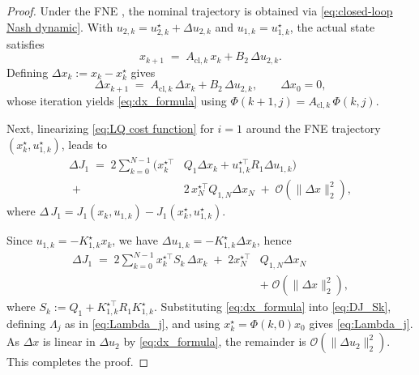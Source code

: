 \documentclass[letterpaper, 10 pt, conference]{ieeeconf}  %
\newtheorem{theorem}{\textbf{Theorem}} %
\begin{document}
\begin{proof}
Under the FNE
, the nominal trajectory is obtained via \eqref{eq:closed-loop Nash dynamic}. With $u_{2,k}=u_{2,k}^\star+\Delta u_{2,k}$ and $u_{1,k}=u_{1,k}^\star$, the actual state satisfies
\begin{equation*}
x_{k+1} \;=\; A_{\text{cl},k} \, x_k + B_2 \, \Delta u_{2,k}.
\end{equation*}
Defining $\Delta x_k := x_k - x_k^\star$ gives
\begin{equation*}\label{eq:dx_recursion}
\Delta x_{k+1} \;=\; A_{\text{cl},k} \, \Delta x_k + B_2 \, \Delta u_{2,k}, \qquad \Delta x_0 = 0,
\end{equation*}
whose iteration yields \eqref{eq:dx_formula} using $\Phi(k+1,j)=A_{\text{cl},k}\,\Phi(k,j)$.

Next, linearizing \eqref{eq:LQ cost function} for $i=1$ around the FNE trajectory $(x_k^\star,u_{1,k}^\star)$, leads to
\begin{equation*}\label{eq:DJ_raw}
\begin{aligned}
    \Delta J_1 \;=\; 2 \sum_{k=0}^{N-1} \big( x_k^{\star\top}& Q_1 \Delta x_k + u_{1,k}^{\star\top} R_1 \Delta u_{1,k} \big)\\
    \;+\; &2 \, x_N^{\star\top} Q_{1,N} \Delta x_N \;+\; \mathcal{O}(\|\Delta x\|_2^2),
\end{aligned}
\end{equation*}
where $\Delta\,J_1 = J_1(x_k,u_{1,k})-J_1(x_k^\star,u_{1,k}^\star)$.

Since $u_{1,k}=-K^\star_{1,k}x_k$, we have $\Delta u_{1,k} = -K^\star_{1,k}\Delta x_k$, hence
\begin{equation}\label{eq:DJ_Sk}
\begin{aligned}
    \Delta J_1 \;=\; 2 \sum_{k=0}^{N-1} x_k^{\star\top} S_k \, \Delta x_k
\;+\; 2 x_N^{\star\top}& Q_{1,N} \Delta x_N \\
\;&+\; \mathcal{O}(\|\Delta x\|_2^2),
\end{aligned}
\end{equation}
where $S_k := Q_1 + K_{1,k}^{\star\top} R_1 K^\star_{1,k}$. Substituting \eqref{eq:dx_formula} into \eqref{eq:DJ_Sk}, defining $\Lambda_j$ as in \eqref{eq:Lambda_j}, and using $x_k^\star=\Phi(k,0)x_0$ gives \eqref{eq:Lambda_j}. As $\Delta x$ is linear in $\Delta u_2$ by \eqref{eq:dx_formula}, the remainder is $\mathcal{O}(\|\Delta u_2\|_2^2)$. This completes the proof.
\end{proof}

\end{document}
